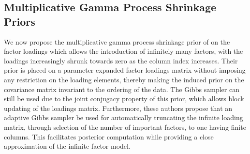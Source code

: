 \documentclass[a4paper,12pt,fleqn]{article}
\numberwithin{equation}{section}
\begin{document}
\subsection[Multiplicative Gamma Process Shrinkage Priors]{Multiplicative Gamma Process Shrinkage Priors}
\label{MGP} We now propose the multiplicative gamma process shrinkage prior of \citet{Bhattacharya2011} on the factor loadings which allows the introduction of infinitely many factors, with the loadings increasingly shrunk towards zero as the column index increases. Their prior is placed on a parameter expanded factor loadings matrix without imposing any restriction on the loading elements, thereby making the induced prior on the covariance matrix invariant to the ordering of the data. The Gibbs sampler can still be used due to the joint conjugacy property of this prior, which allows block updating of the loadings matrix. Furthermore, these authors propose that an adaptive Gibbs sampler be used for automatically truncating the infinite loading matrix, through selection of the number of important factors, to one having finite columns. This facilitates posterior computation while providing a close approximation of the infinite factor model.
\end{document}
